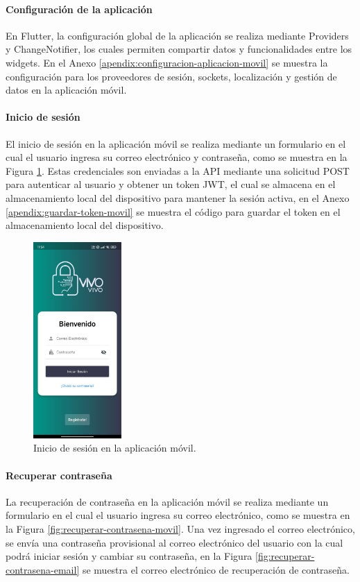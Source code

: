 \paragraph{Configuración de la aplicación}
En Flutter, la configuración global de la aplicación se realiza mediante Providers y ChangeNotifier, los cuales permiten compartir datos y
funcionalidades entre los widgets. En el Anexo \ref{apendix:configuracion-aplicacion-movil} se muestra la configuración para los
proveedores de sesión, sockets, localización y gestión de datos en la aplicación móvil.

\paragraph{Inicio de sesión}
El inicio de sesión en la aplicación móvil se realiza mediante un formulario en el cual el usuario ingresa su correo electrónico y
contraseña, como se muestra en la Figura \ref{fig:inicio-sesion-movil}. Estas credenciales son enviadas a la API mediante una solicitud
POST para autenticar al usuario y obtener un token JWT, el cual se almacena en el almacenamiento local del dispositivo para mantener
la sesión activa, en el Anexo \ref{apendix:guardar-token-movil} se muestra el código para guardar el token en el almacenamiento local del
dispositivo.

\begin{figure}[H]
    \centering
    \includegraphics[width=0.3\textwidth]{chapters/III-resultados-y-discusion/resources/images/inicio-sesion-movil.png}
    \caption{Inicio de sesión en la aplicación móvil.}
    \label{fig:inicio-sesion-movil}
\end{figure}

\paragraph{Recuperar contraseña}
La recuperación de contraseña en la aplicación móvil se realiza mediante un formulario en el cual el usuario ingresa su correo electrónico,
como se muestra en la Figura \ref{fig:recuperar-contrasena-movil}. Una vez ingresado el correo electrónico, se envía una contraseña provisional
al correo electrónico del usuario con la cual podrá iniciar sesión y cambiar su contraseña, en la Figura \ref{fig:recuperar-contrasena-email}
se muestra el correo electrónico de recuperación de contraseña.

